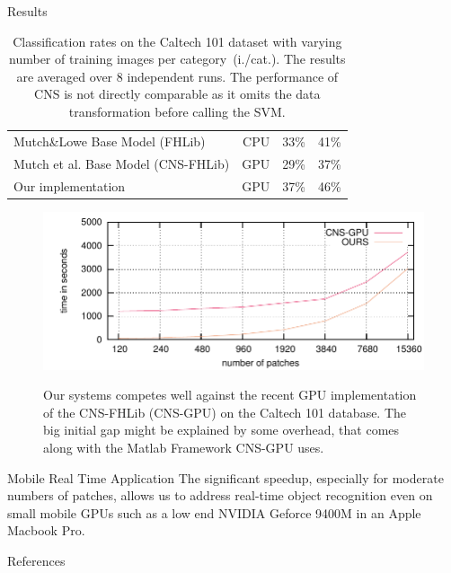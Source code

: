 \documentclass[final]{beamer}
\begin{document}
\begin{frame}{}
\begin{columns}[t]
\begin{column}{.48\linewidth}
\begin{block}{Results}
\begin{table}[t]
\begin{center}
\begin{tabular}{|l|r|r|r|}
      Mutch\&Lowe Base Model (FHLib) \cite{mutch06}      & CPU & 33\% & 41\%\\ %
      Mutch et al. Base Model  (CNS-FHLib) \cite{mutch10} & GPU & 29\%  & 37\%\\ %
      Our implementation                     & GPU & 37\% & 46\%\\
      \hline
    \end{tabular}
        \caption{ Classification rates on the Caltech 101 dataset
      with varying number of training images per category~(i./cat.). 
      The results are averaged over  8 independent runs.  The performance of CNS is not directly
      comparable as it omits the data transformation before calling the SVM.
    }
  \end{center}
\end{table}

\begin{figure}[htb]
  \centering
    \includegraphics[width=\linewidth]{images/PNumTime_max} \\
  \caption{ Our systems competes well against the recent GPU
    implementation of the CNS-FHLib (CNS-GPU) on the Caltech 101 database. 
    The big initial gap might be explained by some overhead, that comes along
    with the Matlab Framework CNS-GPU uses. }
  \label{fig:performance}
\end{figure}
        \end{block}
        
        \begin{block}{Mobile Real Time Application}
        The significant speedup, especially for moderate numbers of patches, allows us to address real-time object recognition even on small mobile GPUs such as a low end NVIDIA Geforce 9400M in an Apple Macbook Pro.   \newline     
        \end{block}
        
        \begin{block}{References}
        \tiny
	
	
	\end{block}
	
       \end{column}
    \end{columns}
  \end{frame}
\end{document}

